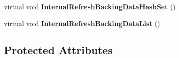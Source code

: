 \begin{DoxyCompactItemize}
\item 
\hypertarget{class_s_e_mod_a_p_i_internal_1_1_a_p_i_1_1_entity_1_1_base_object_manager_a64c4e3c9a778c7e9e2c89d988497f73c}{}virtual void {\bfseries Internal\+Refresh\+Backing\+Data\+Hash\+Set} ()\label{class_s_e_mod_a_p_i_internal_1_1_a_p_i_1_1_entity_1_1_base_object_manager_a64c4e3c9a778c7e9e2c89d988497f73c}

\item 
\hypertarget{class_s_e_mod_a_p_i_internal_1_1_a_p_i_1_1_entity_1_1_base_object_manager_aaaf0fced392871ceaa2ead26a8874896}{}virtual void {\bfseries Internal\+Refresh\+Backing\+Data\+List} ()\label{class_s_e_mod_a_p_i_internal_1_1_a_p_i_1_1_entity_1_1_base_object_manager_aaaf0fced392871ceaa2ead26a8874896}

\end{DoxyCompactItemize}
\subsection*{Protected Attributes}

